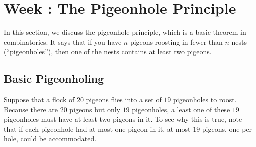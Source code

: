 \documentclass[../notes.tex]{subfiles}
\begin{document}
\section{Week \theweek: The Pigeonhole Principle}
In this section, we discuss the pigeonhole principle, which is a basic theorem in combinatorics. It says that if you have $n$ pigeons roosting in fewer than $n$ nests (``pigeonholes''), then one of the nests contains at least two pigeons.

\subsection{Basic Pigeonholing}
Suppose that a flock of $20$ pigeons flies into a set of $19$ pigeonholes to roost. Because there are $20$ pigeons but only $19$ pigeonholes, a least one of these $19$ pigeonholes must have at least two pigeons in it. To see why this is true, note that if each pigeonhole had at most one pigeon in it, at most $19$ pigeons, one per hole, could be accommodated. %
\end{document}
